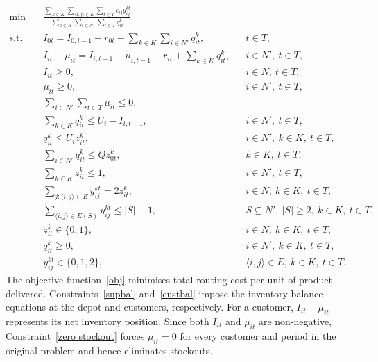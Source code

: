 \documentclass{article}
\begin{document}
\small
\begin{align}
\min \quad &
\frac{
\displaystyle
\sum_{k\in K}
\sum_{\langle i,j\rangle\in E}
\sum_{t\in T}
c_{ij}y_{ij}^{kt}}
{
\displaystyle
\sum_{k\in K}
\sum_{i\in N'}
\sum_{t\in T}
q_{it}^{k}}
\label{obj}
\\
\text{s.t.}\quad
&
I_{0t}
=
I_{0,t-1}+r_{0t}
-
\sum_{k\in K}\sum_{i\in N'}q_{it}^{k},
&& t\in T,
\label{supbal}
\\
&
I_{it}-\mu_{it}
=
I_{i,t-1}-\mu_{i,t-1}-r_{it}
+
\sum_{k\in K}q_{it}^{k},
&& i\in N',\ t\in T,
\label{custbal}
\\
&
I_{it}\geq0,
&& i\in N,\ t\in T,
\label{nonneg_lnv}
\\
&
\mu_{it}\geq0,
&& i\in N',\ t\in T,
\label{nonneg_mu}
\\
&
\sum_{i\in N'}\sum_{t\in T}\mu_{it}\leq0,
&&
\label{zero stockout}
\\
&
\sum_{k\in K}q_{it}^{k}
\leq
U_i-I_{i,t-1},
&& i\in N',\ t\in T,
\label{maxinv}
\\
&
q_{it}^{k}
\leq U_i z_{it}^{k},
&& i\in N',\ k\in K,\ t\in T,
\label{link_qz}
\\
&
\sum_{i\in N'}q_{it}^{k}
\leq Qz_{0t}^{k},
&& k\in K,\ t\in T,
\label{vehcap}
\\
&
\sum_{k\in K}z_{it}^{k}\leq1,
&& i\in N',\ t\in T,
\label{nosplit}
\\
&
\sum_{j:\langle i,j\rangle\in E}y_{ij}^{kt}
=
2z_{it}^{k},
&& i\in N,\ k\in K,\ t\in T,
\label{routing1}
\\
&
\sum_{\langle i,j\rangle\in E(S)}
y_{ij}^{kt}
\leq |S|-1,
&&
S\subseteq N',\ |S|\geq2,\ k\in K,\ t\in T,
\label{subtour}
\\
&
z_{it}^{k}\in\{0,1\},
&& i\in N,\ k\in K,\ t\in T,
\label{binary_z}
\\
&
q_{it}^{k}\geq0,
&& i\in N',\ k\in K,\ t\in T,
\label{nonneg_q}
\\
&
y_{ij}^{kt}\in\{0,1,2\},
&&
\langle i,j\rangle\in E,\ k\in K,\ t\in T.
\label{domain_y}
\end{align}
\normalsize
The objective function~\eqref{obj} minimises total routing cost per unit of
product delivered. Constraints~\eqref{supbal} and~\eqref{custbal} impose the
inventory balance equations at the depot and customers, respectively.
For a customer, $I_{it}-\mu_{it}$ represents its net inventory position.
Since both $I_{it}$ and $\mu_{it}$ are non-negative,
Constraint~\eqref{zero stockout} forces $\mu_{it}=0$ for every customer and
period in the original problem and hence eliminates stockouts.
\end{document}
